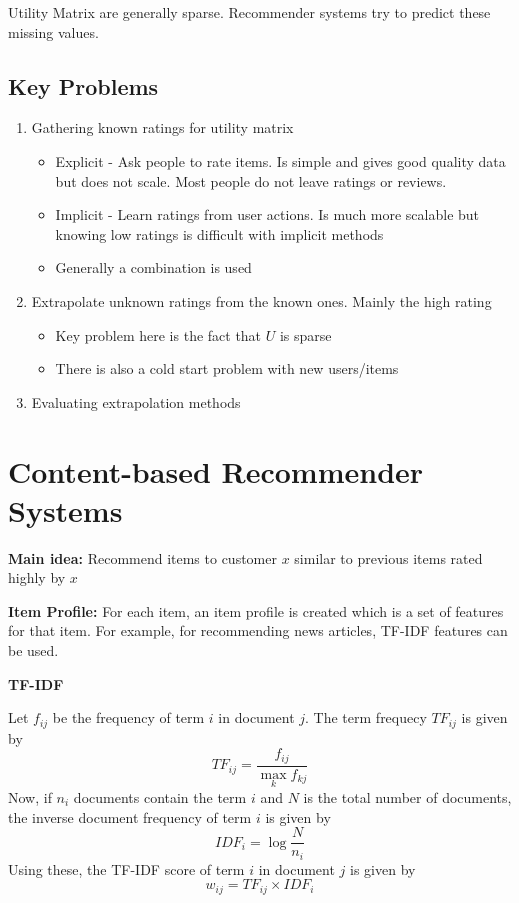 \documentclass{article}
\begin{document}
Utility Matrix are generally sparse. Recommender systems try to predict these missing values.

\subsection{Key Problems}
\begin{enumerate}
    \item Gathering known ratings for utility matrix
    \begin{itemize}
        \item Explicit - Ask people to rate items. Is simple and gives good quality data but does not scale. Most people do not leave ratings or reviews.
        \item Implicit - Learn ratings from user actions. Is much more scalable but knowing low ratings is difficult with implicit methods
        \item Generally a combination is used
    \end{itemize}
    \item Extrapolate unknown ratings from the known ones. Mainly the high rating
    \begin{itemize}
        \item Key problem here is the fact that $U$ is sparse
        \item There is also a cold start problem with new users/items
    \end{itemize}
    \item Evaluating extrapolation methods
\end{enumerate}

\section{Content-based Recommender Systems}
\textbf{Main idea:} Recommend items to customer $x$ similar to previous items rated highly by $x$

\textbf{Item Profile:} For each item, an item profile is created which is a set of features for that item. For example, for recommending news articles, TF-IDF features can be used.

\textbf{TF-IDF}

Let $f_{ij}$ be the frequency of term $i$ in document $j$. The term frequecy $TF_{ij}$ is given by $$TF_{ij} = \frac{f_{ij}}{\max_k f_{kj}}$$
Now, if $n_i$ documents contain the term $i$ and $N$ is the total number of documents, the inverse document frequency of term $i$ is given by $$IDF_i = \log\frac{N}{n_i}$$
Using these, the TF-IDF score of term $i$ in document $j$ is given by $$w_{ij} = TF_{ij} \times IDF_i$$
\end{document}
